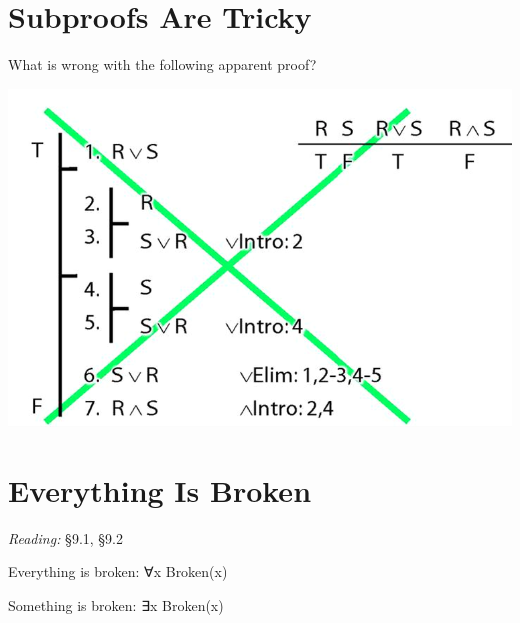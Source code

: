 \documentclass[12pt]{extarticle}
\begin{document}
\begin{multicols*}{3}
 
 
\section{Subproofs Are Tricky}
 
What is wrong with the following apparent proof?
 
\begin{center}
\includegraphics[scale=0.3]{img/unit_224_subproofs_tricky.png}
\end{center}
 
 
\section{Everything Is Broken}
 
\emph{Reading:} §9.1, §9.2
 
Everything is broken: ∀x Broken(x)
 
Something is broken: ∃x Broken(x)
 
 

\end{multicols*}
\end{document}
